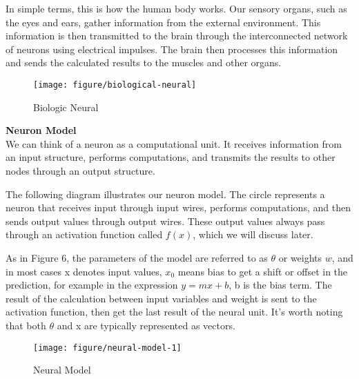 \documentclass{article}
\begin{document}
    In simple terms, this is how the human body works. Our sensory organs, such as the eyes and ears, gather information from the external environment. This information is then transmitted to the brain through the interconnected network of neurons using electrical impulses. The brain then processes this information and sends the calculated results to the muscles and other organs. \\

    \begin{figure}[htbp]
        \centering
        \texttt{[image: figure/biological-neural]}
        \caption{Biologic Neural}
     \end{figure}


    \noindent
    \textbf{Neuron Model}\\
    We can think of a neuron as a computational unit. It receives information from an input structure, performs computations, and transmits the results to other nodes through an output structure.

    The following diagram illustrates our neuron model. The circle represents a neuron that receives input through input wires, performs computations, and then sends output values through output wires. These output values always pass through an activation function called $f(x)$, which we will discuss later.

     As in Figure 6, the parameters of the model are referred to as $\theta$ or weights $w$, and in most cases x denotes input values, $x_0$ means bias to get a shift or offset in the prediction, for example in the expression $y=mx+b$, b is the bias term. The result of the calculation between input variables and weight is sent to the activation function, then get the last result of the neural unit. It's worth noting that both $\theta$ and x are typically represented as vectors.


    \begin{figure}[htbp]
        \centering
        \texttt{[image: figure/neural-model-1]}
        \caption{Neural Model}
     \end{figure}
\end{document}
